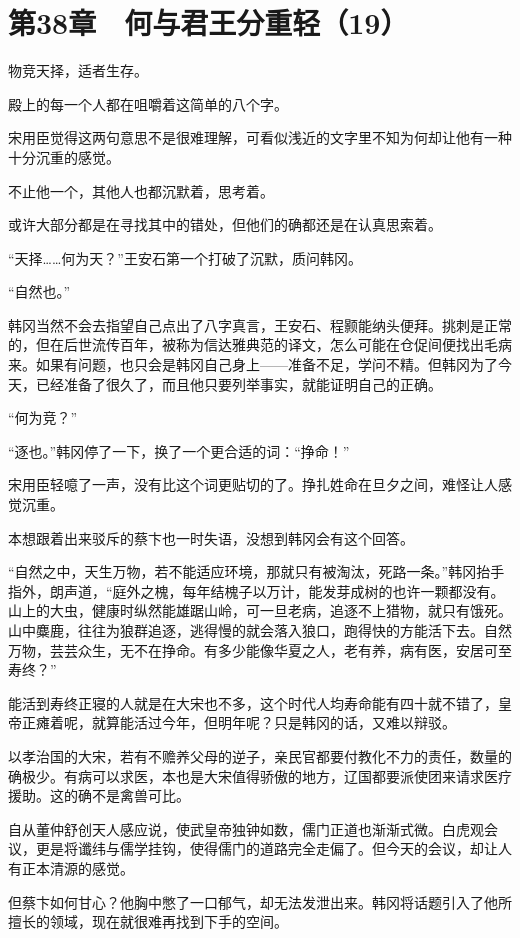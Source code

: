 \section{第38章　何与君王分重轻（19）}

物竞天择，适者生存。

殿上的每一个人都在咀嚼着这简单的八个字。

宋用臣觉得这两句意思不是很难理解，可看似浅近的文字里不知为何却让他有一种十分沉重的感觉。

不止他一个，其他人也都沉默着，思考着。

或许大部分都是在寻找其中的错处，但他们的确都还是在认真思索着。

“天择……何为天？”王安石第一个打破了沉默，质问韩冈。

“自然也。”

韩冈当然不会去指望自己点出了八字真言，王安石、程颢能纳头便拜。挑刺是正常的，但在后世流传百年，被称为信达雅典范的译文，怎么可能在仓促间便找出毛病来。如果有问题，也只会是韩冈自己身上——准备不足，学问不精。但韩冈为了今天，已经准备了很久了，而且他只要列举事实，就能证明自己的正确。

“何为竞？”

“逐也。”韩冈停了一下，换了一个更合适的词：“挣命！”

宋用臣轻噫了一声，没有比这个词更贴切的了。挣扎姓命在旦夕之间，难怪让人感觉沉重。

本想跟着出来驳斥的蔡卞也一时失语，没想到韩冈会有这个回答。

“自然之中，天生万物，若不能适应环境，那就只有被淘汰，死路一条。”韩冈抬手指外，朗声道，“庭外之槐，每年结槐子以万计，能发芽成树的也许一颗都没有。山上的大虫，健康时纵然能雄踞山岭，可一旦老病，追逐不上猎物，就只有饿死。山中麋鹿，往往为狼群追逐，逃得慢的就会落入狼口，跑得快的方能活下去。自然万物，芸芸众生，无不在挣命。有多少能像华夏之人，老有养，病有医，安居可至寿终？”

能活到寿终正寝的人就是在大宋也不多，这个时代人均寿命能有四十就不错了，皇帝正瘫着呢，就算能活过今年，但明年呢？只是韩冈的话，又难以辩驳。

以孝治国的大宋，若有不赡养父母的逆子，亲民官都要付教化不力的责任，数量的确极少。有病可以求医，本也是大宋值得骄傲的地方，辽国都要派使团来请求医疗援助。这的确不是禽兽可比。

自从董仲舒创天人感应说，使武皇帝独钟如数，儒门正道也渐渐式微。白虎观会议，更是将谶纬与儒学挂钩，使得儒门的道路完全走偏了。但今天的会议，却让人有正本清源的感觉。

但蔡卞如何甘心？他胸中憋了一口郁气，却无法发泄出来。韩冈将话题引入了他所擅长的领域，现在就很难再找到下手的空间。

